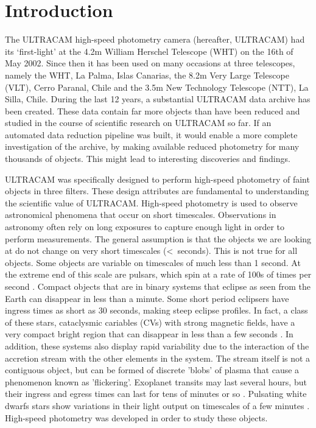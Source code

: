 \section{Introduction} 

The ULTRACAM high-speed photometry camera (hereafter, ULTRACAM) had its `first-light' at the 4.2m William Herschel Telescope (WHT) on the 16th of May 2002. Since then it has been used on many occasions at three telescopes, namely the WHT, La Palma, Islas Canarias, the 8.2m Very Large Telescope (VLT), Cerro Paranal, Chile and the 3.5m New Technology Telescope (NTT), La Silla, Chile. During the last 12 years, a substantial ULTRACAM data archive has been created. These data contain far more objects than have been reduced  and studied in the course of scientific research on ULTRACAM so far. If an automated data reduction pipeline was built, it would enable a more complete investigation of the archive, by making available reduced photometry for many thousands of objects. This might lead to interesting discoveries and findings. 

ULTRACAM was specifically designed to perform high-speed photometry of faint objects in three filters. These design attributes are fundamental to understanding the scientific value of ULTRACAM.  High-speed photometry is used to observe astronomical phenomena that occur on short timescales. Observations in astronomy often rely on long exposures to capture enough light in order to perform measurements. The general assumption is that the objects we are looking at do not change on very short timescales (\textless~seconds). This is not true for all objects. Some objects are variable on timescales of much less than 1 second. At the extreme end of this scale are pulsars, which spin at a rate of 100s of times per second \citep{pulsarreview}. Compact objects that are in binary systems that eclipse as seen from the Earth can disappear in less than a minute. Some short period eclipsers have ingress times as short as 30 seconds, making steep eclipse profiles. In fact, a class of these stars, cataclysmic cariables (CVs) with strong magnetic fields, have a very compact bright region that can disappear in less than a few seconds \citep{WarnerBook}. In addition, these systems also display rapid variability due to the interaction of the accretion stream with the other elements in the system. The stream itself is not a contiguous object, but can be formed of discrete 'blobs' of plasma that cause a phenomenon known as 'flickering'. Exoplanet transits may last several hours, but their ingress and egress times can last for tens of minutes or so \citep{exoplanettransits}. Pulsating white dwarfs stars show variations in their light output on timescales of a few minutes \citep{wingetreview}.  High-speed photometry was developed in order to study these objects. 

